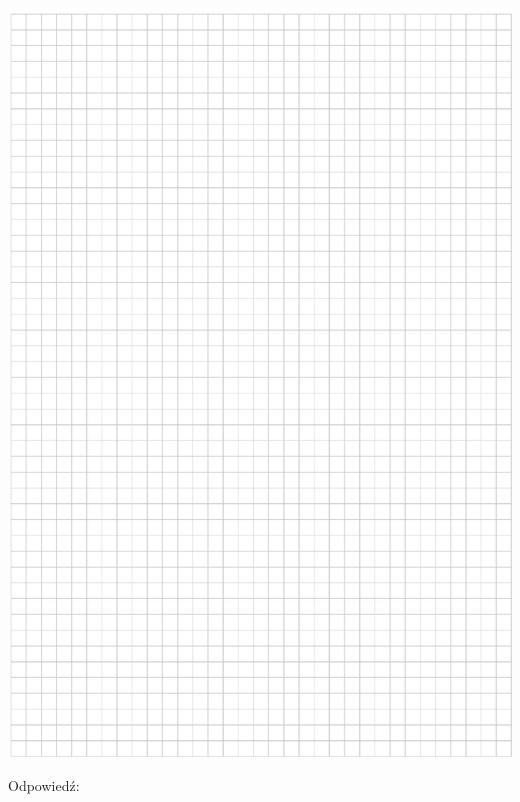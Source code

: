 \documentclass[10pt]{article}
\begin{document}
\includegraphics[max width=\textwidth, center]{2024_11_21_d9af6ed2d610d3f2d2cbg-03}

Odpowiedź:
\end{document}
